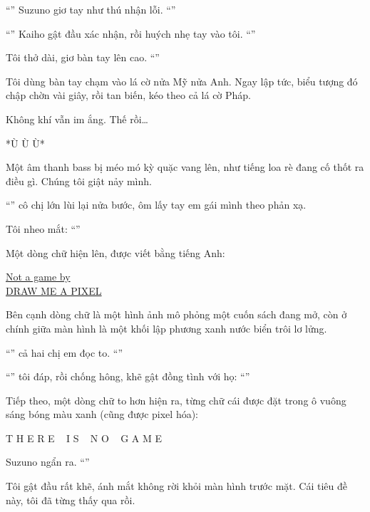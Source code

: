 \documentclass[../main.tex]{subfiles}
\begin{document}
``'' Suzuno giơ tay như thú nhận lỗi. ``''

``'' Kaiho gật đầu xác nhận, rồi huých nhẹ tay vào tôi. ``''

Tôi thở dài, giơ bàn tay lên cao. ``''

Tôi dùng bàn tay chạm vào lá cờ nửa Mỹ nửa Anh. Ngay lập tức, biểu tượng đó chập chờn vài giây, rồi tan biến, kéo theo cả lá cờ Pháp.

Không khí vẫn im ắng. Thế rồi\dots

*Ù Ù Ù*

Một âm thanh bass bị méo mó kỳ quặc vang lên, như tiếng loa rè đang cố thốt ra điều gì. Chúng tôi giật nảy mình.

``'' cô chị lớn lùi lại nửa bước, ôm lấy tay em gái mình theo phản xạ.

Tôi nheo mắt: ``''

Một dòng chữ hiện lên, được viết bằng tiếng Anh:

\begin{center}
  \uline{Not a game by\\DRAW ME A PIXEL}
\end{center}

Bên cạnh dòng chữ là một hình ảnh mô phỏng một cuốn sách đang mở, còn ở chính giữa màn hình là một khối lập phương xanh nước biển trôi lơ lửng.


``'' cả hai chị em đọc to. ``''

``'' tôi đáp, rồi chống hông, khẽ gật đồng tình với họ: ``''

Tiếp theo, một dòng chữ to hơn hiện ra, từng chữ cái được đặt trong ô vuông sáng bóng màu xanh (cũng được pixel hóa):

\begin{center}
  T H E R E   I S   N O   G A M E
\end{center}


Suzuno ngẩn ra. ``''

Tôi gật đầu rất khẽ, ánh mắt không rời khỏi màn hình trước mặt. Cái tiêu đề này, tôi đã từng thấy qua rồi.
\end{document}
